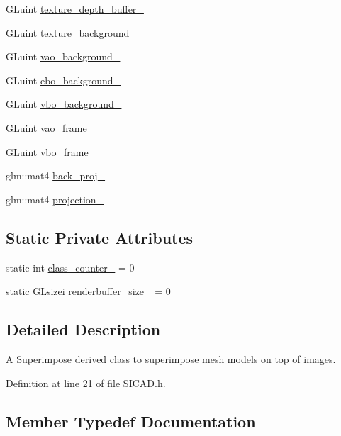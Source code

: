 \begin{DoxyCompactItemize}
\item 
G\+Luint \mbox{\hyperlink{classSICAD_a2fed5ac56bb2206fe8f6eccc9d784015}{texture\+\_\+depth\+\_\+buffer\+\_\+}}
\item 
G\+Luint \mbox{\hyperlink{classSICAD_a2728fb0fa0be11f0992bc81b4873da4f}{texture\+\_\+background\+\_\+}}
\item 
G\+Luint \mbox{\hyperlink{classSICAD_a19306fe768bae547e18a3b9366e37389}{vao\+\_\+background\+\_\+}}
\item 
G\+Luint \mbox{\hyperlink{classSICAD_a2cdcd11dd55a4b02b85d7c32435cc719}{ebo\+\_\+background\+\_\+}}
\item 
G\+Luint \mbox{\hyperlink{classSICAD_a86d6184b8c557460317a158e8d9508d1}{vbo\+\_\+background\+\_\+}}
\item 
G\+Luint \mbox{\hyperlink{classSICAD_ae91abeb0fe30f27e0fc40649235f3437}{vao\+\_\+frame\+\_\+}}
\item 
G\+Luint \mbox{\hyperlink{classSICAD_af58ffe3edf622ab96f669fcd6e210be9}{vbo\+\_\+frame\+\_\+}}
\item 
glm\+::mat4 \mbox{\hyperlink{classSICAD_ad5945f84df0d90113a24b2001ecbc832}{back\+\_\+proj\+\_\+}}
\item 
glm\+::mat4 \mbox{\hyperlink{classSICAD_afb91b682fd1f6629f163ab321869e7e0}{projection\+\_\+}}
\end{DoxyCompactItemize}
\subsection*{Static Private Attributes}
\begin{DoxyCompactItemize}
\item 
static int \mbox{\hyperlink{classSICAD_a16f7c3c77ddea5ba57bbcbcdd7a8d125}{class\+\_\+counter\+\_\+}} = 0
\item 
static G\+Lsizei \mbox{\hyperlink{classSICAD_aca24504d58ce97106dbc95925f36fca0}{renderbuffer\+\_\+size\+\_\+}} = 0
\end{DoxyCompactItemize}


\subsection{Detailed Description}
A \mbox{\hyperlink{classSuperimpose}{Superimpose}} derived class to superimpose mesh models on top of images. 

Definition at line 21 of file S\+I\+C\+A\+D.\+h.



\subsection{Member Typedef Documentation}
\mbox{\label{classSICAD_aca3c9693d298f2e8dc171194c6a7507c}} 
